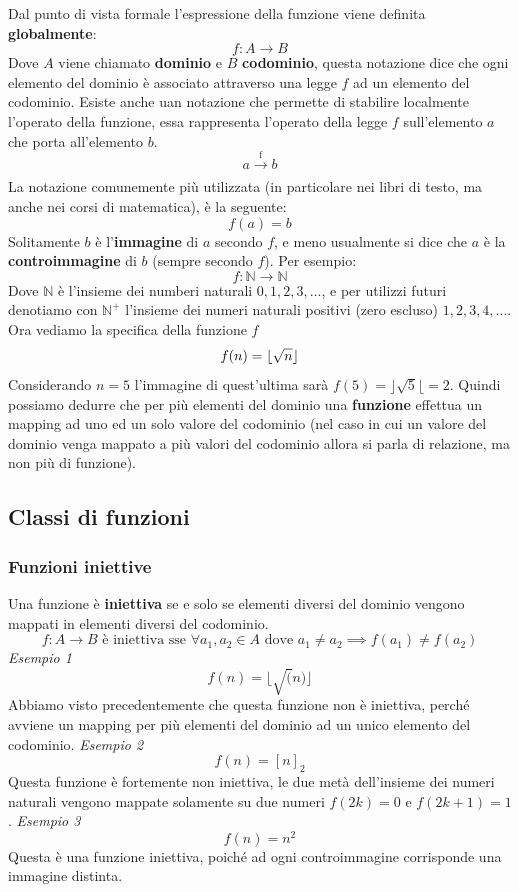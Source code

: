 \documentclass{article}
\begin{document}
Dal punto di vista formale l'espressione della funzione viene definita \textbf{globalmente}:
$$f:A\rightarrow B$$
Dove $A$ viene chiamato \textbf{dominio} e $B$ \textbf{codominio}, questa notazione dice che ogni elemento del dominio è associato attraverso una legge $f$ ad un elemento del codominio. Esiste anche uan notazione che permette di stabilire localmente l'operato della funzione, essa rappresenta l'operato della legge $f$ sull'elemento $a$ che porta all'elemento $b$.
$$a \xrightarrow[\text{}]{\text{f}} b$$
\newline
La notazione comunemente più utilizzata (in particolare nei libri di testo, ma anche nei corsi di matematica), è la seguente:
$$f(a)=b$$
Solitamente $b$ è l'\textbf{immagine} di $a$ secondo $f$, e meno usualmente si dice che $a$ è la \textbf{controimmagine} di $b$ (sempre secondo $f$).
\newline
\newline
Per esempio:
$$f:\mathbb{N} \rightarrow \mathbb{N}$$
Dove $\mathbb{N}$ è l'insieme dei numberi naturali ${0,1,2,3,...}$, e per utilizzi futuri denotiamo con $\mathbb{N}^+$ l'insieme dei numeri naturali positivi (zero escluso) ${1,2,3,4,...}$.
\newline
Ora vediamo la specifica della funzione $f$
$$f(n)=\lfloor \sqrtsign{n}\rfloor$$
Considerando $n=5$ l'immagine di quest'ultima sarà $f(5)=\rfloor\sqrt{5}\lfloor=2$.
\newline
Quindi possiamo dedurre che per più elementi del dominio una \textbf{funzione} effettua un mapping ad uno ed un solo valore del codominio (nel caso in cui un valore del dominio venga mappato a più valori del codominio allora si parla di relazione, ma non più di funzione).
\subsection{Classi di funzioni}
\subsubsection{Funzioni iniettive}

Una funzione è \textbf{iniettiva} se e solo se elementi diversi del dominio vengono mappati in elementi diversi del codominio.
$$f:A\rightarrow B\text{ è iniettiva sse } \forall a_1,a_2\in A \text{ dove } a_1\neq a_2 \implies f(a_1)\neq f(a_2)$$
\newline
\textit{Esempio 1}
$$f(n)=\lfloor\sqrt(n)\rfloor$$
Abbiamo visto precedentemente che questa funzione non è iniettiva, perché avviene un mapping per più elementi del dominio ad un unico elemento del codominio.
\newline
\newline
\textit{Esempio 2}
$$f(n)=[n]_2$$
Questa funzione è fortemente non iniettiva, le due metà dell'insieme dei numeri naturali vengono mappate solamente su due numeri $f(2k)=0$ e $f(2k+1)=1$.
\newline
\newline
\textit{Esempio 3}
$$f(n)=n^2$$
Questa è una funzione iniettiva, poiché ad ogni controimmagine corrisponde una immagine distinta.
\end{document}

